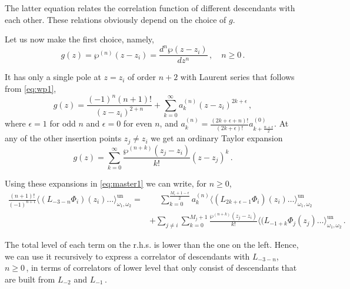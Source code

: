 \documentclass[11pt,a4paper]{article}
\numberwithin{equation}{section}
\begin{document}
\noindent 
The latter equation relates the correlation function of different descendants with each other. These relations obviously depend on the choice of $g$. 

Let us now make the first choice, namely, 
%
\begin{equation}
    g(z) = \wp^{(n)}(z-z_i) = \frac{d^n \wp(z-z_i)}{dz^n}\,,\quad n\ge 0\,. 
\end{equation}

\noindent
It has only a single pole at $z=z_i$ of order $n+2$ with Laurent series that follows from \eqref{eq:wp1},
%
\begin{equation}
    g(z) = \frac{(-1)^{n}(n+1)!}{(z-z_i)^{2+n}} + \sum_{k=0}^\infty a_k^{(n)} (z-z_i)^{2k+\epsilon}\,,
\end{equation}
%
where $\epsilon = 1$ for odd $n$ and $\epsilon =0$ for even $n$, and $a_k^{(n)} = \frac{(2k+\epsilon+n)!}{(2k+\epsilon)!} a^{(0)}_{k+\frac{n+\epsilon}{2}}$. At any of the other insertion points $z_j\neq z_i$ we get an ordinary Taylor expansion
%
\begin{equation}
    g(z) = \sum_{k=0}^\infty \frac{\wp^{(n+k)}(z_j-z_i)}{k!} (z-z_j)^k\,.
\end{equation}

\noindent
Using these expansions in \eqref{eq:master1} we can write, for $n \ge 0$,
%
\begin{align}
    \frac{(n+1)!}{(-1)^{n+1}}\big\langle (L_{-3-n}\Phi_i)(z_i)\dots\big\rangle_{\omega_1,\omega_2}^\mathrm{un} =&\phantom{+} \sum_{k=0}^{\tfrac{M_i+1-\epsilon}{2}} a_k^{(n)} \big\langle (L_{2k+\epsilon-1}\Phi_i)(z_i)\dots\big\rangle_{\omega_1,\omega_2}^\mathrm{un}
     \label{eq:TC1}\\
&+ \sum_{j\neq i} \sum_{k=0}^{M_j+1} \frac{\wp^{(n+k)}(z_j-z_i)}{k!} \big\langle (L_{-1+k}\Phi_j(z_j)\dots\big\rangle_{\omega_1,\omega_2}^\mathrm{un}\,.\nonumber
\end{align}

\noindent 
The total level of each term on the r.h.s. is lower than the one on the left. Hence, we can use it recursively to express a correlator of descendants with $L_{-3-n}$, $n\ge0$\,, in terms of correlators of lower level that only consist of descendants that are built from $L_{-2}$ and $L_{-1}$\,.
\end{document}
